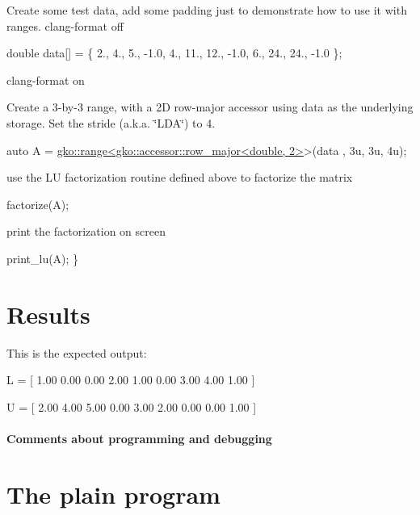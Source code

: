Create some test data, add some padding just to demonstrate how to use it with ranges. clang-\/format off


\begin{DoxyCode}
\textcolor{keywordtype}{double} data[] = \{
    2.,  4.,  5., -1.0,
    4., 11., 12., -1.0,
    6., 24., 24., -1.0
\};
\end{DoxyCode}


clang-\/format on

Create a 3-\/by-\/3 range, with a 2D row-\/major accessor using data as the underlying storage. Set the stride (a.\+k.\+a. \char`\"{}\+L\+D\+A\char`\"{}) to 4.


\begin{DoxyCode}
\textcolor{keyword}{auto} A = \hyperlink{classgko_1_1range}{gko::range<gko::accessor::row\_major<double, 2>}>(data
      , 3u, 3u, 4u);
\end{DoxyCode}


use the LU factorization routine defined above to factorize the matrix


\begin{DoxyCode}
factorize(A);
\end{DoxyCode}


print the factorization on screen


\begin{DoxyCode}
    print\_lu(A);
\}
\end{DoxyCode}
 \label{_Results}%
\section*{Results}

This is the expected output\+:


\begin{DoxyCode}
L = [
  1.00 0.00 0.00 
  2.00 1.00 0.00 
  3.00 4.00 1.00 
]

U = [
  2.00 4.00 5.00 
  0.00 3.00 2.00 
  0.00 0.00 1.00 
]
\end{DoxyCode}


\label{_Commentsaboutprogramminganddebugging}%
\paragraph*{Comments about programming and debugging }

\label{_PlainProg}%
 \section*{The plain program}


